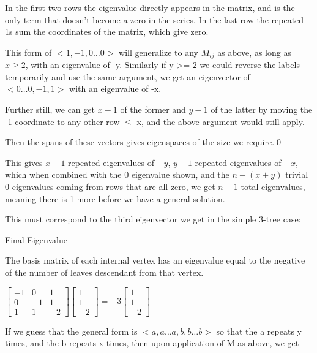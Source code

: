 \documentclass[10pt,a4paper]{report}
\begin{document}
In the first two rows the eigenvalue directly appears in the matrix, and is the
only term that doesn't become a zero in the series.
In the last row the repeated 1s sum the coordinates of the matrix, which give
zero.

This form of $<1, -1, 0\ldots 0>$ will generalize to any $M_{ij}$ as above, as
long as $x \geq 2$, with an eigenvalue of -y.
Similarly if y >= 2 we could reverse the labels temporarily and use the same
argument, we get an eigenvector of $<0\ldots 0, -1, 1>$ with an eigenvalue of
-x.

Further still, we can get $x-1$ of the former and $y-1$ of the latter by moving
the -1 coordinate to any other row $\leq$ x, and the above argument would still
apply.

Then the spans of these vectors gives eigenspaces of the size we require.\qed


This gives $x-1$ repeated eigenvalues of $-y$, $y-1$ repeated eigenvalues of
$-x$, which when combined with the 0 eigenvalue shown, and the $n - (x + y)$
trivial $0$ eigenvalues coming from rows that are all zero, we get $n-1$ total
eigenvalues, meaning there is 1 more before we have a general solution.

This must correspond to the third eigenvector we get in the simple 3-tree case:

\begin{lemma} Final Eigenvalue

	The basis matrix of each internal vertex has an eigenvalue equal to the
	negative of the number of leaves descendant from that vertex.
\end{lemma}

$
\left[\begin{matrix}
	-1 & 0 & 1\\
	0 & -1 & 1\\
	1 & 1 & -2
\end{matrix}\right]
\left[\begin{matrix}
	1\\
	1\\
	-2
\end{matrix}\right]
=
-3
\left[\begin{matrix}
	1\\
	1\\
	-2
\end{matrix}\right]
$

If we guess that the general form is $<a, a\ldots a, b, b\ldots b>$ so that the
a repeats y times, and the b repeats x times, then upon application of M as
above, we get
\end{document}
